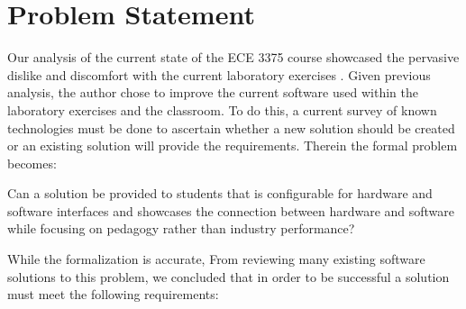 \section{Problem Statement}
\label{sec:problem-statement}

Our analysis of the current state of the ECE 3375 course showcased the pervasive dislike and discomfort with the current laboratory exercises \cite{evals:ece3375-2013, evals:ece3375-2014}. Given previous analysis, the author chose to improve the current software used within the laboratory exercises and the classroom. To do this, a current survey of known technologies must be done to ascertain whether a new solution should be created or an existing solution will provide the requirements. Therein the formal problem becomes: 
\begin{displayquote}
    Can a solution be provided to students that is configurable for hardware and software interfaces and showcases the connection between hardware and software while focusing on pedagogy rather than industry performance? 
\end{displayquote}
While the formalization is accurate,  From reviewing many existing software solutions to this problem, we concluded that in order to be successful a solution must meet the following requirements:

